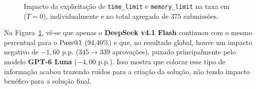 \begin{figure}[!htbp]
\centering

\caption[Pass@1 em C no Baseline versus PP3]{Impacto da explicitação de \texttt{time\_limit} e \texttt{memory\_limit} na taxa  em  ($T=0$), individualmente e no total agregado de $375$ submissões.}
\label{fig:res-pp3-pass1}
\end{figure}
\FloatBarrier

Na Figura~\ref{fig:res-pp3-pass1}, vê-se que apenas o \textbf{DeepSeek v4.1 Flash} continuou com o mesmo percentual para o $\mathrm{Pass@}1$ (94,40\%) e que, no resultado global, houve um impacto negativo de $-1{,}60\text{ p.p.}$ ($345 \rightarrow 339$ aprovações), puxado principalmente pelo modelo \textbf{GPT-6 Luna} ($-4{,}00\text{ p.p.}$). Isso mostra que colocar esse tipo de informação acabou trazendo ruídos para a criação da solução, não tendo impacto benéfico para a solução final.

\begin{table}[!htbp]
\centering
\caption[Comparativo consolidado em C: Baseline versus PP3 com limites explícitos]{Comparativo consolidado em  nos $125$ problemas: \textit{Baseline} versus \texttt{PP3} com limites explícitos.}
\label{tab:res-pp3-comparativo}
\end{table}

